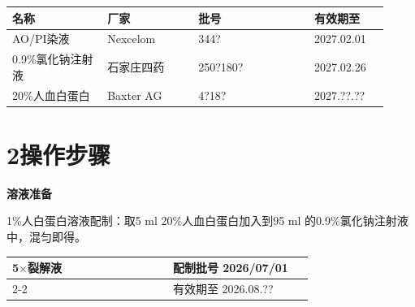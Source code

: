 \documentclass[UTF8,10pt,a4paper,fontset=fandol]{ctexart}
\newcommand{\fieldvalue}[1]{#1}
\newcommand{\handwritten}[1]{#1}
\begin{document}
\begin{tabular}{|p{0.23\linewidth}|p{0.22\linewidth}|p{0.29\linewidth}|p{0.18\linewidth}|}
\hline
名称 & 厂家 & 批号 & 有效期至\\
\hline
\fieldvalue{AO/PI染液} &
\fieldvalue{Nexcelom} &
\fieldvalue{\handwritten{344?}} &
\fieldvalue{\handwritten{2027.02.01}}\\
\hline
\fieldvalue{0.9\%氯化钠注射液} &
\fieldvalue{石家庄四药} &
\fieldvalue{\handwritten{250?180?}} &
\fieldvalue{\handwritten{2027.02.26}}\\
\hline
\fieldvalue{20\%人血白蛋白} &
\fieldvalue{Baxter AG} &
\fieldvalue{\handwritten{4?18?}} &
\fieldvalue{\handwritten{2027.??.??}}\\
\hline
\end{tabular}

\section{2\quad 操作步骤}

\begin{center}
\textbf{溶液准备}
\end{center}

1\%人白蛋白溶液配制：取5 ml 20\%人血白蛋白加入到95 ml
的0.9\%氯化钠注射液中，混匀即得。

\begin{tabular}{|p{0.48\linewidth}|p{0.42\linewidth}|}
\hline
5$\times$裂解液 & 配制批号 \quad
\fieldvalue{\handwritten{2026/07/01}}\\
\cline{2-2}
& 有效期至 \quad
\fieldvalue{\handwritten{2026.08.??}}\\
\hline
\end{tabular}
\end{document}
